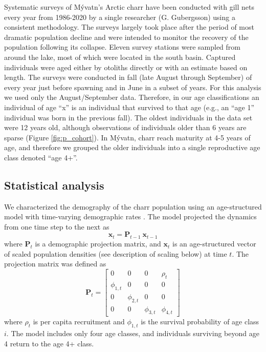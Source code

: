 \documentclass[11pt]{article}
\begin{document}
Systematic surveys of M\'{y}vatn’s Arctic charr have been conducted 
with gill nets every year from 1986-2020 by a single researcher (G. Gu{\dh}bergsson) 
using a consistent methodology. 
The surveys largely took place after the period of most dramatic population decline 
\citep{gudbergsson2004} 
and were intended to monitor the recovery of the population following its collapse. 
Eleven survey stations were sampled from around the lake,
most of which were located in the south basin. 
Captured individuals were aged either by otoliths directly or 
with an estimate based on length.
The surveys were conducted in fall (late August through September) 
of every year just before spawning and in June in a subset of years. 
For this analysis we used only the August/September data. 
Therefore, in our age classifications an individual of age ``x'' is an individual 
that survived to that age (e.g., an ``age 1'' individual was born in the previous fall). 
The oldest individuals in the data set were 12 years old, although observations 
of individuals older than 6 years are sparse
(Figure \ref{fig:p_cohort}). 
In M\'{y}vatn, charr reach maturity at 4-5 years of age, 
and therefore we grouped the older individuals into a single reproductive age class
denoted ``age 4+''.

\subsection*{Statistical analysis} 

We characterized the demography of the charr population 
using an age-structured model \citep{caswell2001matrix}
with time-varying demographic rates 
\citep{zeng1998, ives2012detecting, nielsen2014estimation}.
The model projected the dynamics from one time step to the next as
%
\begin{equation} \label{eq:XPX}
    \mathbf{x}_t = \mathbf{P}_{t-1}~\mathbf{x}_{t-1}
\end{equation}
%
where $\mathbf{P}_{t}$ is a demographic projection matrix,
and $\mathbf{x}_t$ is an age-structured vector of scaled population densities 
(see description of scaling below) at time $t$.
%
The projection matrix was defined as
%
\begin{equation} \label{eq:matrix}
\mathbf{P}_{t} = 
\left[
\begin{array}{cccccccc}
    0             & 0             & 0             & \rho_{t}     \\
    \phi_{1,t}    & 0             & 0             & 0            \\
    0             & \phi_{2,t}    & 0             & 0            \\
    0             & 0             & \phi_{3,t}    & \phi_{4,t}
    \end{array}
\right]
\end{equation}
%
where $\rho_{t}$ is per capita recruitment 
and $\phi_{1,t}$ is the survival probability of age class $i$. 
The model includes only four age classes,
and individuals surviving beyond age 4 return to the age 4+ class.
\end{document}
